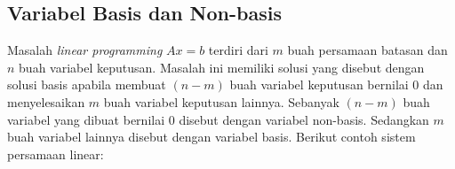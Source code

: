 	
		
		
		
		
		

\subsection{Variabel Basis dan Non-basis}
Masalah \textit{linear programming} \(Ax = b\) terdiri dari \(m\) buah persamaan batasan dan \(n\) buah variabel keputusan. Masalah ini memiliki solusi yang disebut dengan solusi basis apabila membuat \((n - m)\) buah variabel keputusan bernilai 0 dan menyelesaikan \(m\) buah variabel keputusan lainnya. Sebanyak \((n - m)\) buah variabel yang dibuat bernilai 0 disebut dengan variabel non-basis. Sedangkan \(m\) buah variabel lainnya disebut dengan variabel basis. Berikut contoh sistem persamaan linear:

